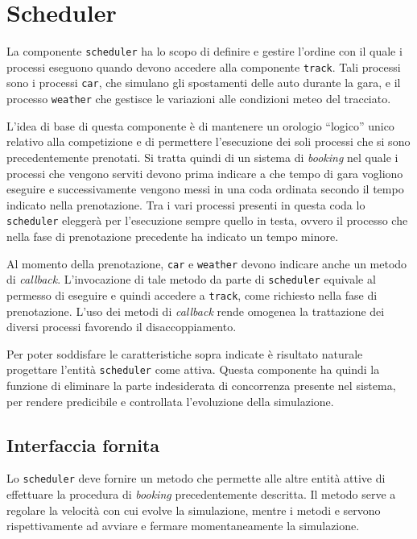 \section{Scheduler}
La componente \texttt{scheduler} ha lo scopo di definire e gestire l'ordine con il quale i processi eseguono quando devono accedere alla componente \texttt{track}.
Tali processi sono i processi \texttt{car}, che simulano gli spostamenti delle auto durante la gara, e il processo \texttt{weather} che gestisce le variazioni alle condizioni meteo del tracciato.

L'idea di base di questa componente è di mantenere un orologio ``logico'' unico relativo alla competizione e di permettere l'esecuzione dei soli processi che si sono precedentemente prenotati. Si tratta quindi di un sistema di \textit{booking} nel quale i processi che vengono serviti devono prima indicare a che tempo di gara vogliono eseguire e successivamente vengono messi in una coda ordinata secondo il tempo indicato nella prenotazione. Tra i vari processi presenti in questa coda lo \texttt{scheduler} eleggerà per l'esecuzione sempre quello in testa, ovvero il processo che nella fase di prenotazione precedente ha indicato un tempo minore.

Al momento della prenotazione, \texttt{car} e \texttt{weather} devono indicare anche un metodo di \textit{callback}. L'invocazione di tale metodo da parte di \texttt{scheduler} equivale al permesso di eseguire e quindi accedere a \texttt{track}, come richiesto nella fase di prenotazione. L'uso dei metodi di \textit{callback} rende omogenea la trattazione dei diversi processi favorendo il disaccoppiamento.

Per poter soddisfare le caratteristiche sopra indicate è risultato naturale progettare l'entità \texttt{scheduler} come attiva.
Questa componente ha quindi la funzione di eliminare la parte indesiderata di concorrenza presente nel sistema, per rendere predicibile e controllata l'evoluzione della simulazione.

\subsection*{Interfaccia fornita}
Lo \texttt{scheduler} deve fornire un metodo  che permette alle altre entità attive di effettuare la procedura di \textit{booking} precedentemente descritta.
Il metodo  serve a regolare la velocità con cui evolve la simulazione, mentre i metodi  e  servono rispettivamente ad avviare e fermare momentaneamente la simulazione.

